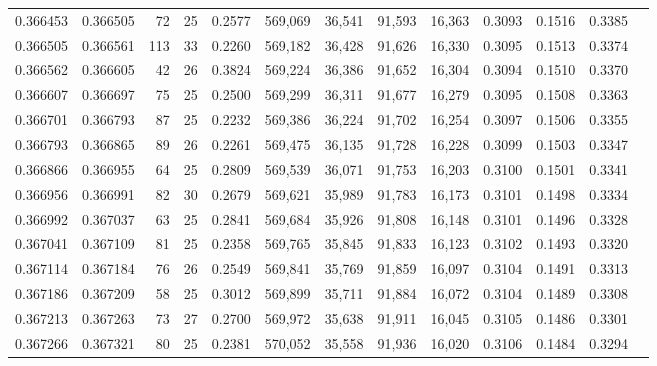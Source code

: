 \begin{tabular}{rrrrrrrrrrrrr}
0.366453 & 0.366505 &    72 &  25 &                                     0.2577 & 569,069 &  36,541 &  91,593 &  16,363 & 0.3093 & 0.1516 & 0.3385 \\
0.366505 & 0.366561 &   113 &  33 &                                     0.2260 & 569,182 &  36,428 &  91,626 &  16,330 & 0.3095 & 0.1513 & 0.3374 \\
0.366562 & 0.366605 &    42 &  26 &                                     0.3824 & 569,224 &  36,386 &  91,652 &  16,304 & 0.3094 & 0.1510 & 0.3370 \\
0.366607 & 0.366697 &    75 &  25 &                                     0.2500 & 569,299 &  36,311 &  91,677 &  16,279 & 0.3095 & 0.1508 & 0.3363 \\
0.366701 & 0.366793 &    87 &  25 &                                     0.2232 & 569,386 &  36,224 &  91,702 &  16,254 & 0.3097 & 0.1506 & 0.3355 \\
0.366793 & 0.366865 &    89 &  26 &                                     0.2261 & 569,475 &  36,135 &  91,728 &  16,228 & 0.3099 & 0.1503 & 0.3347 \\
0.366866 & 0.366955 &    64 &  25 &                                     0.2809 & 569,539 &  36,071 &  91,753 &  16,203 & 0.3100 & 0.1501 & 0.3341 \\
0.366956 & 0.366991 &    82 &  30 &                                     0.2679 & 569,621 &  35,989 &  91,783 &  16,173 & 0.3101 & 0.1498 & 0.3334 \\
0.366992 & 0.367037 &    63 &  25 &                                     0.2841 & 569,684 &  35,926 &  91,808 &  16,148 & 0.3101 & 0.1496 & 0.3328 \\
0.367041 & 0.367109 &    81 &  25 &                                     0.2358 & 569,765 &  35,845 &  91,833 &  16,123 & 0.3102 & 0.1493 & 0.3320 \\
0.367114 & 0.367184 &    76 &  26 &                                     0.2549 & 569,841 &  35,769 &  91,859 &  16,097 & 0.3104 & 0.1491 & 0.3313 \\
0.367186 & 0.367209 &    58 &  25 &                                     0.3012 & 569,899 &  35,711 &  91,884 &  16,072 & 0.3104 & 0.1489 & 0.3308 \\
0.367213 & 0.367263 &    73 &  27 &                                     0.2700 & 569,972 &  35,638 &  91,911 &  16,045 & 0.3105 & 0.1486 & 0.3301 \\
0.367266 & 0.367321 &    80 &  25 &                                     0.2381 & 570,052 &  35,558 &  91,936 &  16,020 & 0.3106 & 0.1484 & 0.3294 \\

\end{tabular}
